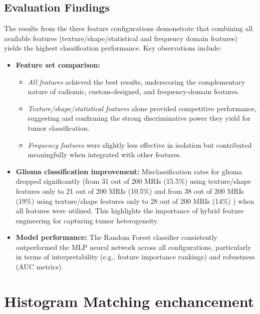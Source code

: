 \documentclass[11pt,a4paper]{article}
\begin{document}
\subsection{Evaluation Findings}

The results from the three feature configurations demonstrate that combining all available 
features (texture/shape/statistical and frequency domain features) yields the highest 
classification performance. Key observations include:

\begin{itemize}
    \item \textbf{Feature set comparison:}

    \begin{itemize}
        \item \textit{All features} achieved the best results, underscoring the complementary nature of radiomic, custom-designed, 
		and frequency-domain features.
        \item \textit{Texture/shape/statistical features} alone provided competitive performance, 
		suggesting and confirming the strong discriminative power they yield for tumor classification.
        \item \textit{Frequency features} were slightly less effective in isolation 
		but contributed meaningfully when integrated with other features.
    \end{itemize}
    
    \item \textbf{Glioma classification improvement:}
	    Misclassification rates for glioma dropped significantly (from 31 out of 200 MRIs (15.5\%) using texture/shape features 
		only to 21 out of 200 MRIs (10.5\%)  and from 38 out of 200 MRIs (19\%) using texture/shape features 
		only to 28 out of 200 MRIs (14\%)  )
		when all features were utilized. This highlights the importance of hybrid feature engineering for capturing tumor heterogeneity.
    
    \item \textbf{Model performance:}
		The Random Forest classifier consistently outperformed the MLP neural network across all configurations, 
		particularly in terms of interpretability (e.g., feature importance rankings) and robustness (AUC metrics).
\end{itemize}


\section{Histogram Matching enchancement}
\end{document}
